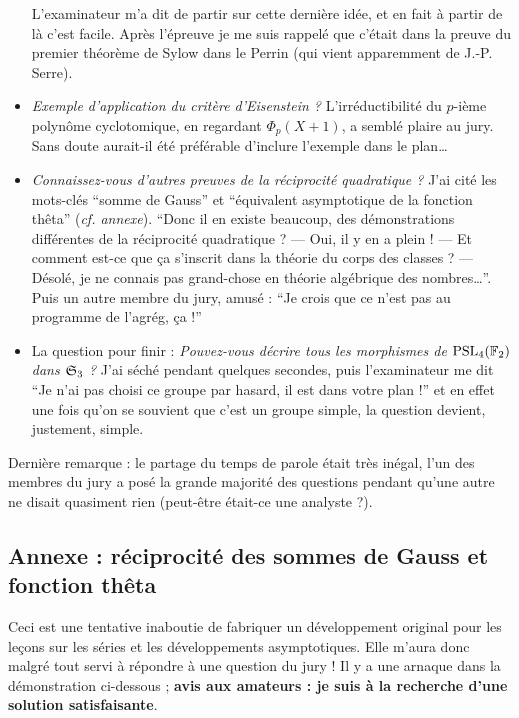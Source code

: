 \documentclass[a4paper, 11pt]{article}
\begin{document}
\begin{itemize}
  L'examinateur m'a dit de partir sur cette dernière idée, et en fait à partir
  de là c'est facile. Après l'épreuve je me suis rappelé que c'était dans la
  preuve du premier théorème de Sylow dans le Perrin (qui vient apparemment de
  J.-P. Serre).
\item \emph{Exemple d'application du critère d'Eisenstein ?} L'irréductibilité
  du $p$-ième polynôme cyclotomique, en regardant $\Phi_p(X+1)$, a semblé plaire
  au jury. Sans doute aurait-il été préférable d'inclure l'exemple dans le plan…
\item \emph{Connaissez-vous d'autres preuves de la réciprocité quadratique ?}
  J'ai cité les mots-clés \enquote{somme de Gauss} et \enquote{équivalent
    asymptotique de la fonction thêta} (\emph{cf. annexe}). \enquote{Donc il en
    existe beaucoup, des démonstrations différentes de la réciprocité
    quadratique ? --- Oui, il y en a plein ! --- Et comment est-ce que ça
    s'inscrit dans la théorie du corps des classes ? --- Désolé, je ne connais
    pas grand-chose en théorie algébrique des nombres…}.
  Puis un autre membre du jury, amusé : \enquote{Je crois que ce n'est pas au
    programme de l'agrég, ça !}
\item La question pour finir : \emph{Pouvez-vous décrire tous les morphismes de
    $\mathrm{PSL}_4(\mathbb{F}_2)$ dans $\mathfrak{S}_3$ ?} J'ai séché pendant quelques secondes,
  puis l'examinateur me dit \enquote{Je n'ai pas choisi ce groupe par hasard, il
    est dans votre plan !} et en effet une fois qu'on se souvient que c'est un
  groupe simple, la question devient, justement, simple.
\end{itemize}

Dernière remarque : le partage du temps de parole était très inégal, l'un des
membres du jury a posé la grande majorité des questions pendant qu'une autre ne
disait quasiment rien (peut-être était-ce une analyste ?).

\newpage

\subsection*{Annexe : réciprocité des sommes de Gauss et fonction thêta}

\def\N{\mathbb{N}}
\def\R{\mathbb{R}}
\def\Re{\textnormal{Re}}

Ceci est une tentative inaboutie de fabriquer un développement original pour les
leçons sur les séries et les développements asymptotiques. Elle m'aura donc
malgré tout servi à répondre à une question du jury ! Il y a une arnaque dans la
démonstration ci-dessous ; \textbf{avis aux amateurs : je suis à la recherche
  d'une solution satisfaisante}.
\end{document}
